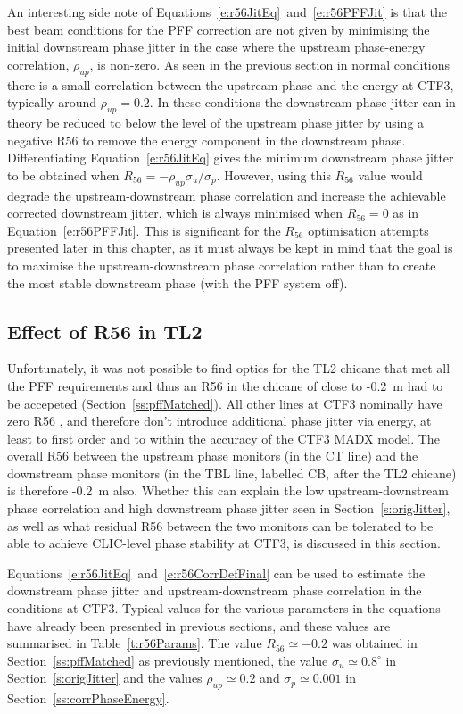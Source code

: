An interesting side note of Equations~\ref{e:r56JitEq}~and~\ref{e:r56PFFJit} is that the best beam conditions for the PFF correction are not given by minimising the initial downstream phase jitter in the case where the upstream phase-energy correlation, \(\rho_{up}\), is non-zero. As seen in the previous section in normal conditions there is a small correlation between the upstream phase and the energy at CTF3, typically around \(\rho_{up}=0.2\). In these conditions the downstream phase jitter can in theory be reduced to below the level of the upstream phase jitter by using a negative R56 to remove the energy component in the downstream phase. Differentiating Equation~\ref{e:r56JitEq} gives the minimum downstream phase jitter to be obtained when \(R_{56} = -\rho_{up}\sigma_u/\sigma_p\). However, using this \(R_{56}\) value would degrade the upstream-downstream phase correlation and increase the achievable corrected downstream jitter, which is always minimised when \(R_{56} = 0\) as in Equation~\ref{e:r56PFFJit}. This is significant for the \(R_{56}\) optimisation attempts presented later in this chapter, as it must always be kept in mind that the goal is to maximise the upstream-downstream phase correlation rather than to create the most stable downstream phase (with the PFF system off).

\subsection{Effect of R56 in TL2}
\label{ss:r56TL2Effect}

Unfortunately, it was not possible to find optics for the TL2 chicane that met all the PFF requirements and thus an R56 in the chicane of close to -0.2~m had to be accepeted (Section~\ref{ss:pffMatched}). All other lines at CTF3 nominally have zero R56 \cite{CTF3}, and therefore don't introduce additional phase jitter via energy, at least to first order and to within the accuracy of the CTF3 MADX model. The overall R56 between the upstream phase monitors (in the CT line) and the downstream phase monitors (in the TBL line, labelled CB, after the TL2 chicane) is therefore -0.2~m also. Whether this can explain the low upstream-downstream phase correlation and high downstream phase jitter seen in Section~\ref{s:origJitter}, as well as what residual R56 between the two monitors can be tolerated to be able to achieve CLIC-level phase stability at CTF3, is discussed in this section.

Equations~\ref{e:r56JitEq}~and~\ref{e:r56CorrDefFinal} can be used to estimate the downstream phase jitter and upstream-downstream phase correlation in the conditions at CTF3. Typical values for the various parameters in the equations have already been presented in previous sections, and these values are summarised in Table~\ref{t:r56Params}. The value \(R_{56}\simeq -0.2\) was obtained in Section~\ref{ss:pffMatched} as previously mentioned, the value \(\sigma_u\simeq0.8^\circ\) in Section~\ref{s:origJitter} and the values \(\rho_{up}\simeq 0.2\) and \(\sigma_p\simeq 0.001\) in Section~\ref{ss:corrPhaseEnergy}.


